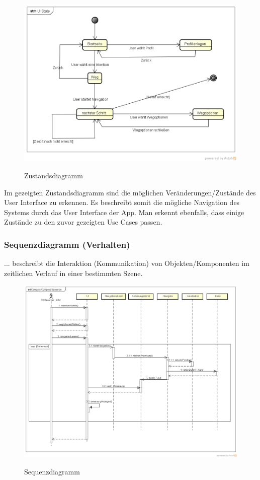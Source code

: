 \begin{figure}[hbt]
  \centering
  \includegraphics[width=\linewidth]{img/zustandsdiagramm.png}
  \label{img:zustandsdiagramm}
  \caption{Zustandsdiagramm}
\end{figure}

Im gezeigten Zustandsdiagramm sind die möglichen Veränderungen/Zustände des User Interface zu erkennen. Es beschreibt somit die mögliche Navigation des Systems durch das User Interface der App. Man erkennt ebenfalls, dass einige Zustände zu den zuvor gezeigten Use Cases passen.

\newpage

\subsubsection*{Sequenzdiagramm (Verhalten)}
... beschreibt die Interaktion (Kommunikation) von Objekten/Komponenten im zeitlichen Verlauf in einer bestimmten Szene.

\begin{figure}[hbt]
  \centering
  \includegraphics[width=\linewidth]{img/sequenzdiagramm.png}
  \label{img:sequenzdiagramm}
  \caption{Sequenzdiagramm}
\end{figure}

